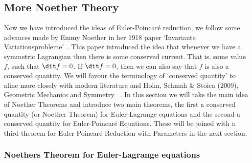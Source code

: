 
\subsection{More Noether Theory}
Now we have introduced the ideas of Euler-Poincar\'e reduction, we follow some advances made by Emmy Noether in her 1918 paper `Invariante Variationsprobleme'~\cite{Noether1918}. This paper introduced the idea that whenever we have a symmetric Lagrangian then there is some conserved current. That is, some value $f$, such that $\dit f = 0$. If $\dit f = 0$, then we can also say that $f$ is also a conserved quantity. We will favour the terminology of `conserved quantity' to aline more closely with modern literature and Holm, Schmah \& Stoica (2009), Geometric Mechanics and Symmetry ~\cite{holm_schmah_stoica_2009}. In this section we will take the main idea of Noether Theorems and introduce two main theorems, the first a conserved quantity (or Noether Theorem) for Euler-Lagrange equations and the second a conserved quantity for Euler-Poincar\'e Equations. These will be joined with a third theorem for Euler-Poincar\'e Reduction with Parameters in the next section.
\subsubsection{Noethers Theorem for Euler-Lagrange equations}

